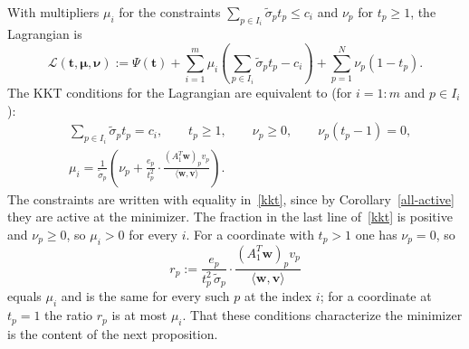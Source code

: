 \documentclass[11pt]{article}
\theoremstyle{plain}
\theoremstyle{definition}
\theoremstyle{remark}
\numberwithin{equation}{section}
\numberwithin{figure}{section}
\numberwithin{table}{section}
\numberwithin{algorithm}{section}
\begin{document}
With multipliers $\mu_i$ for the constraints $\sum_{p\in I_i}\widetilde\sigma_pt_p\le c_i$
and $\nu_p$ for $t_p\ge 1$, the Lagrangian is
\begin{equation}\label{lagrangian}
\mathcal{L}(\bm t,\bm\mu,\bm\nu):=\Psi(\bm t)
+\sum_{i=1}^m\mu_i\left(\sum_{p\in I_i}\widetilde\sigma_pt_p-c_i\right)
+\sum_{p=1}^N\nu_p\left(1-t_p\right).
\end{equation}
The KKT conditions for the Lagrangian are equivalent to (for $i=1:m$ and $p\in I_i$):
\begin{equation}\label{kkt}
\begin{aligned}
&\sum_{p\in I_i}\widetilde\sigma_pt_p=c_i,\qquad t_p\ge 1,\qquad \nu_p\ge 0,\qquad \nu_p\left(t_p-1\right)=0,\\
&\mu_i=\frac{1}{\widetilde\sigma_p}\left(\nu_p+\frac{e_p}{t_p^2}\cdot
\frac{\left(A_1^T\bm w\right)_pv_p}{\langle\bm w,\bm v\rangle}\right).
\end{aligned}
\end{equation}
The constraints are written with equality in~\eqref{kkt}, since
by Corollary~\ref{all-active} they are active at the minimizer. The fraction
in the last line of~\eqref{kkt} is positive and $\nu_p\ge 0$, so $\mu_i>0$ for
every $i$. For a coordinate with $t_p>1$ one has $\nu_p=0$, so
\begin{equation}\label{ratio}
r_p:=\frac{e_p}{t_p^2\,\widetilde\sigma_p}\cdot
\frac{\left(A_1^T\bm w\right)_pv_p}{\langle\bm w,\bm v\rangle}
\end{equation}
equals $\mu_i$ and is the same for every such $p$ at the index $i$; for a
coordinate at $t_p=1$ the ratio $r_p$ is at most $\mu_i$. That these conditions characterize the minimizer is the content
of the next proposition.
\end{document}

